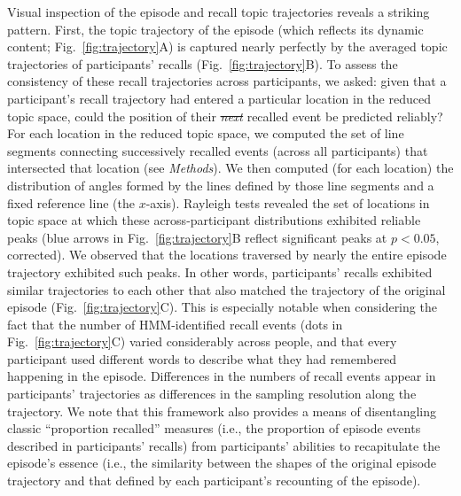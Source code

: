 \documentclass[10pt]{article}
\renewcommand{\includegraphics}[2][]{} %
\newcommand{\arrows}{4} %
\providecommand{\DIFaddtex}[1]{{\protect\color{blue}\uwave{#1}}} %
\providecommand{\DIFdeltex}[1]{{\protect\color{red}\sout{#1}}}                      %
\providecommand{\DIFaddbegin}{} %
\providecommand{\DIFaddend}{} %
\providecommand{\DIFdelbegin}{} %
\providecommand{\DIFdelend}{} %
\providecommand{\DIFadd}[1]{\texorpdfstring{\DIFaddtex{#1}}{#1}} %
\providecommand{\DIFdel}[1]{\texorpdfstring{\DIFdeltex{#1}}{}} %
\newcommand{\DIFscaledelfig}{0.5}
\newlength{\DIFdelgraphicswidth} %
\newlength{\DIFdelgraphicsheight} %
\newcommand{\DIFaddincludegraphics}[2][]{{\color{blue}\fbox{\DIFOincludegraphics[#1]{#2}}}} %
\newcommand{\DIFdelincludegraphics}[2][]{%
\sbox{\DIFdelgraphicsbox}{\DIFOincludegraphics[#1]{#2}}%
\settoboxwidth{\DIFdelgraphicswidth}{\DIFdelgraphicsbox} %
\settoboxtotalheight{\DIFdelgraphicsheight}{\DIFdelgraphicsbox} %
\scalebox{\DIFscaledelfig}{%
\parbox[b]{\DIFdelgraphicswidth}{\usebox{\DIFdelgraphicsbox}\\[-\baselineskip] \rule{\DIFdelgraphicswidth}{0em}}\llap{\resizebox{\DIFdelgraphicswidth}{\DIFdelgraphicsheight}{%
\setlength{\unitlength}{\DIFdelgraphicswidth}%
\begin{picture}(1,1)%
\thicklines\linethickness{2pt} %
{\color[rgb]{1,0,0}\put(0,0){\framebox(1,1){}}}%
{\color[rgb]{1,0,0}\put(0,0){\line( 1,1){1}}}%
{\color[rgb]{1,0,0}\put(0,1){\line(1,-1){1}}}%
\end{picture}%
}\hspace*{3pt}}} %
} %
\DeclareRobustCommand{\DIFaddbegin}{\DIFOaddbegin \let\includegraphics\DIFaddincludegraphics} %
\DeclareRobustCommand{\DIFaddend}{\DIFOaddend \let\includegraphics\DIFOincludegraphics} %
\DeclareRobustCommand{\DIFdelbegin}{\DIFOdelbegin \let\includegraphics\DIFdelincludegraphics} %
\DeclareRobustCommand{\DIFdelend}{\DIFOaddend \let\includegraphics\DIFOincludegraphics} %
\begin{document}
Visual inspection of the episode and recall topic trajectories reveals a striking pattern.  First, the topic trajectory of the episode (which reflects its dynamic content; Fig.~\ref{fig:trajectory}A) is captured nearly perfectly by the averaged topic trajectories of participants' recalls (Fig.~\ref{fig:trajectory}B).  To assess the consistency of these recall trajectories across participants, we asked: given that a participant's recall trajectory had entered a particular location in the reduced topic space, could the position of their \DIFdelbegin \textit{\DIFdel{next}} %
\DIFdelend \DIFaddbegin \DIFadd{next }\DIFaddend recalled event be predicted reliably?  For each location in the reduced topic space, we computed the set of line segments connecting successively recalled events (across all participants) that intersected that location (see \textit{Methods}\DIFaddbegin \DIFadd{, Supp.\ Fig.~\arrows}\DIFaddend ).  We then computed (for each location) the distribution of angles formed by the lines defined by those line segments and a fixed reference line (the $x$-axis).  Rayleigh tests revealed the set of locations in topic space at which these across-participant distributions exhibited reliable peaks (blue arrows in Fig.~\ref{fig:trajectory}B reflect significant peaks at $p < 0.05$, corrected).  We observed that the locations traversed by nearly the entire episode trajectory exhibited such peaks.  In other words, participants' recalls exhibited similar trajectories to each other that also matched the trajectory of the original episode (Fig.~\ref{fig:trajectory}C).  This is especially notable when considering the fact that the number of HMM-identified recall events (dots in Fig.~\ref{fig:trajectory}C) varied considerably across people, and that every participant used different words to describe what they had remembered happening in the episode.  Differences in the numbers of recall events appear in participants' trajectories as differences in the sampling resolution along the trajectory.  We note that this framework also provides a means of disentangling classic ``proportion recalled'' measures (i.e., the proportion of episode events described in participants' recalls) from participants' abilities to recapitulate the episode's essence (i.e., the similarity between the shapes of the original episode trajectory and that defined by each participant's recounting of the episode).
\end{document}
